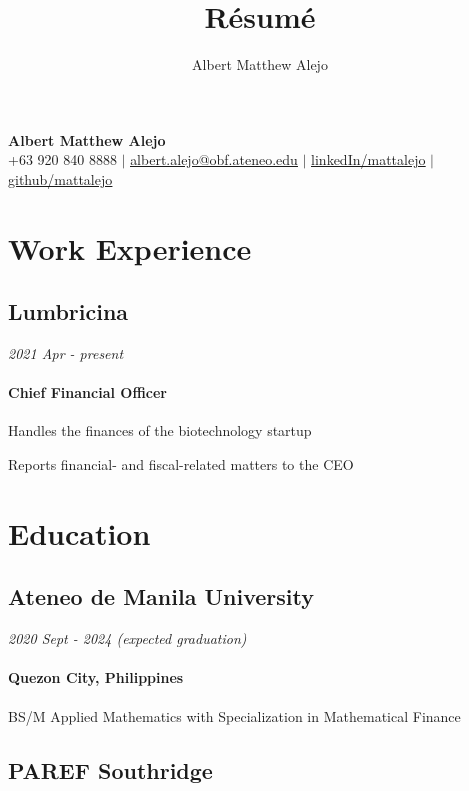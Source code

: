 \documentclass[a4paper,10pt]{article}
\title{R\'esum\'e}
\author{Albert Matthew Alejo}
\makeatletter
\newcommand{\dates}{\hfill\textit}
\newcommand{\yourName}{Albert Matthew Alejo}
\newcommand{\yourEmail}{albert.alejo@obf.ateneo.edu}
\newcommand{\yourPhone}{+63 920 840 8888 }
\newcommand{\githubUserName}{mattalejo}
\newcommand{\linkedInUserName}{mattalejo}
\makeatother
\begin{document}
\begin{center}
\textbf{\huge \yourName} \\ \vspace{0.25em}
\small \yourPhone $|$ 
\href{mailto:\yourEmail}{\underline{\yourEmail}} $|$ 
\href{https://linkedin.com/in/\linkedInUserName}{\underline{linkedIn/\linkedInUserName}} $|$
\href{https://github.com/\githubUserName}{\underline{github/\githubUserName}}
\end{center}
\vspace{0.25em}

\section{Work Experience}

\subsection{Lumbricina}

\dates{2021 Apr - present}

\paragraph{Chief Financial Officer}

Handles the finances of the biotechnology startup

Reports financial- and fiscal-related matters to the CEO


\section{Education}

\subsection{Ateneo de Manila University}

\dates{2020 Sept - 2024 (expected graduation)}

\paragraph{Quezon City, Philippines}

BS/M Applied Mathematics with Specialization in Mathematical Finance

\subsection{PAREF Southridge} 
\end{document}
